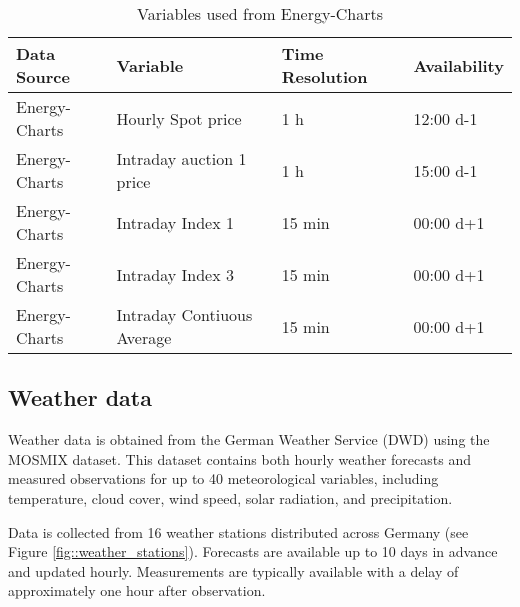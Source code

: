 \documentclass[class=scrbook, crop=false]{standalone}
\begin{document}

    
\begin{table}[]
\centering
\begin{tabular}{l|l|l|l}
 Data Source & Variable &  Time Resolution & Availability  \\\hline
 Energy-Charts & Hourly Spot price& 1 h& 12:00 d-1 \\
 Energy-Charts & Intraday auction 1 price & 1 h &  15:00 d-1\\
 Energy-Charts & Intraday Index 1 & 15 min &  00:00 d+1\\
 Energy-Charts & Intraday Index 3 & 15 min &  00:00 d+1\\
 Energy-Charts & Intraday Contiuous Average & 15 min &  00:00 d+1\\
   
\end{tabular}
\caption{Variables used from Energy-Charts}
\label{Table::Market_Data}
\end{table}

\subsection{Weather data}
\label{Section::Weather_Data}

Weather data is obtained from the German Weather Service (DWD) using the MOSMIX dataset. This dataset contains both hourly weather forecasts and measured observations for up to 40 meteorological variables, including temperature, cloud cover, wind speed, solar radiation, and precipitation.

Data is collected from 16 weather stations distributed across Germany (see Figure \ref{fig::weather_stations}). Forecasts are available up to 10 days in advance and updated hourly. Measurements are typically available with a delay of approximately one hour after observation.
\end{document}
